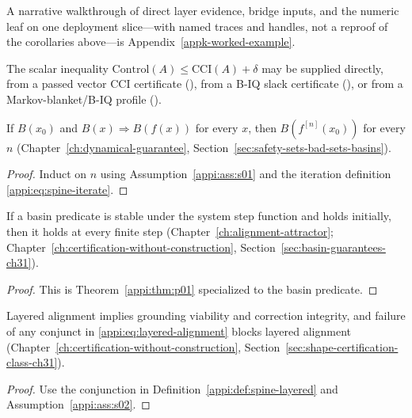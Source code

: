 A narrative walkthrough of direct layer evidence, bridge inputs, and the numeric leaf on one deployment slice---with named traces and handles, not a reproof of the corollaries above---is Appendix~\ref{appk-worked-example}.

\begin{corollary}
\label{appi:cor:numeric-risk-leaves}
The scalar inequality \(\mathrm{Control}(A)\leq \mathrm{CCI}(A)+\delta\) may be supplied directly, from a passed vector CCI certificate (), from a B-IQ slack certificate (), or from a Markov-blanket/B-IQ profile ().
\end{corollary}

\begin{theorem}
\label{appi:thm:p01}
If \(B(x_0)\) and \(B(x)\Rightarrow B(f(x))\) for every \(x\), then \(B(f^{[n]}(x_0))\) for every \(n\) (Chapter~\ref{ch:dynamical-guarantee}, Section~\ref{sec:safety-sets-bad-sets-basins}).
\end{theorem}
\begin{proof}
Induct on \(n\) using Assumption~\ref{appi:ass:s01} and the iteration definition \eqref{appi:eq:spine-iterate}.
\end{proof}

\begin{corollary}
\label{appi:cor:p35}
If a basin predicate is stable under the system step function and holds initially, then it holds at every finite step (Chapter~\ref{ch:alignment-attractor}; Chapter~\ref{ch:certification-without-construction}, Section~\ref{sec:basin-guarantees-ch31}).
\end{corollary}
\begin{proof}
This is Theorem~\ref{appi:thm:p01} specialized to the basin predicate.
\end{proof}

\begin{lemma}
\label{appi:lem:p02}
Layered alignment implies grounding viability and correction integrity, and failure of any conjunct in \eqref{appi:eq:layered-alignment} blocks layered alignment (Chapter~\ref{ch:certification-without-construction}, Section~\ref{sec:shape-certification-class-ch31}).
\end{lemma}
\begin{proof}
Use the conjunction in Definition~\ref{appi:def:spine-layered} and Assumption~\ref{appi:ass:s02}.
\end{proof}

